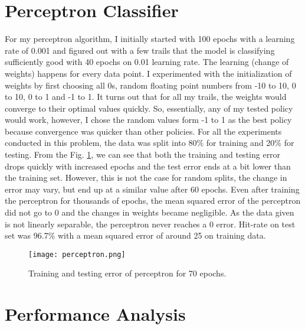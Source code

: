 \documentclass[a4paper,11pt]{article}
\begin{document}
\newpage
\section{Perceptron Classifier}
For my perceptron algorithm, I initially started with 100 epochs with a learning rate of 0.001 and figured out with a few trails that the model is classifying sufficiently good with 40 epochs on 0.01 learning rate. The learning (change of weights) happens for every data point. I experimented with the initialization of weights by first choosing all 0s, random floating point numbers from -10 to 10, 0 to 10, 0 to 1 and -1 to 1. It turns out that for all my trails, the weights would converge to their optimal values quickly. So, essentially, any of my tested policy would work, however, I chose the random values form -1 to 1 as the best policy because convergence was quicker than other policies. For all the experiments conducted in this problem, the data was split into 80\% for training and 20\% for testing. From the Fig. \ref{fig:2.1}, we can see that both the training and testing error drops quickly with increased epochs and the test error ends at a bit lower than the training set. However, this is not the case for random splits, the change in error may vary, but end up at a similar value after 60 epochs. Even after training the perceptron for thousands of epochs, the mean squared error of the perceptron did not go to 0 and the changes in weights became negligible. As the data given is not linearly separable, the perceptron never reaches a 0 error. Hit-rate on test set was 96.7\% with a mean squared error of around 25 on training data.

\begin{figure}[h!]
    \centering
    \texttt{[image: perceptron.png]}
    \caption{Training and testing error of perceptron for 70 epochs.}
    \label{fig:2.1}
\end{figure}

\newpage
\section{Performance Analysis}
\end{document}
